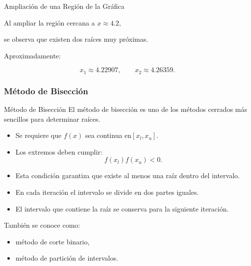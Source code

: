 \documentclass[../../main.tex]{subfiles}
\begin{document}
\begin{frame}{Ampliación de una Región de la Gráfica}

Al ampliar la región cercana a \(x\approx4.2,\)

se observa que existen dos raíces muy próximas.

\begin{center}


\end{center}

Aproximadamente:

\[
x_1\approx4.22907,
\qquad
x_2\approx4.26359.
\]

\end{frame}



\subsubsection{Método de Bisección}

\begin{frame}{Método de Bisección}
El método de bisección es uno de los métodos cerrados más sencillos para determinar raíces.
\begin{itemize}
    \item Se requiere que \(f(x)\) sea continua en\( [x_l,x_u].\)
    \item Los extremos deben cumplir:
    \[
    f(x_l)f(x_u)<0.
    \]
    \item Esta condición garantiza que existe al menos una raíz dentro del intervalo.
    \item En cada iteración el intervalo se divide en dos partes iguales.
    \item El intervalo que contiene la raíz se conserva para la siguiente iteración.
\end{itemize}
También se conoce como:
\begin{itemize}
    \item método de corte binario,
    \item método de partición de intervalos.
\end{itemize}
\end{frame}
\end{document}
